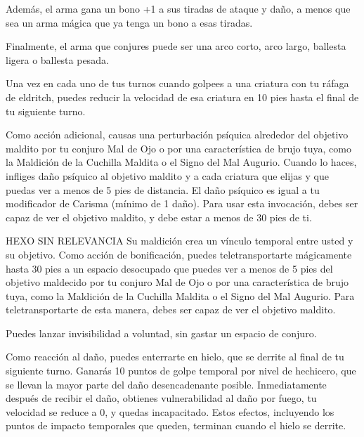 \documentclass[a4paper,twocolumn,openany,10pt]{dndbook}
\begin{document}
Además, el arma gana un bono +1 a sus tiradas de ataque y daño, a menos que sea un arma mágica que ya tenga un bono a esas
tiradas.

Finalmente, el arma que conjures puede ser una arco corto, arco largo, ballesta ligera o ballesta pesada.

Una vez en cada uno de tus turnos cuando golpees a una criatura con tu ráfaga de eldritch, puedes reducir la velocidad de esa
criatura en 10 pies hasta el final de tu siguiente turno.

Como acción adicional, causas una perturbación psíquica alrededor del objetivo maldito por tu conjuro Mal de Ojo o por una
característica de brujo tuya, como la Maldición de la Cuchilla Maldita o el Signo del Mal Augurio. Cuando lo haces, infliges
daño psíquico al objetivo maldito y a cada criatura que elijas y que puedas ver a menos de 5 pies de distancia. El daño psíquico
es igual a tu modificador de Carisma (mínimo de 1 daño). Para usar esta invocación, debes ser capaz de ver el objetivo maldito,
y debe estar a menos de 30 pies de ti.

HEXO SIN RELEVANCIA
Su maldición crea un vínculo temporal entre usted y su objetivo. Como acción de bonificación, puedes teletransportarte
mágicamente hasta 30 pies a un espacio desocupado que puedes ver a menos de 5 pies del objetivo maldecido por tu conjuro
Mal de Ojo o por una característica de brujo tuya, como la Maldición de la Cuchilla Maldita o el Signo del Mal Augurio. Para
teletransportarte de esta manera, debes ser capaz de ver el objetivo maldito.

Puedes lanzar invisibilidad a voluntad, sin gastar un espacio de conjuro.

Como reacción al daño, puedes enterrarte en hielo, que se derrite al final de tu siguiente turno. Ganarás 10 puntos de golpe
temporal por nivel de hechicero, que se llevan la mayor parte del daño desencadenante posible. Inmediatamente después de recibir
el daño, obtienes vulnerabilidad al daño por fuego, tu velocidad se reduce a 0, y quedas incapacitado. Estos efectos, incluyendo
los puntos de impacto temporales que queden, terminan cuando el hielo se derrite.
\end{document}
